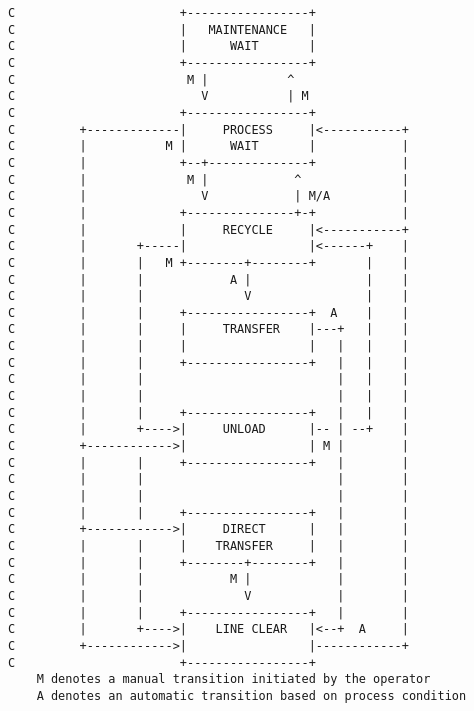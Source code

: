 \documentclass[a4paper,oneside]{article}
\begin{document}
\begin{verbatim}
C                       +-----------------+                  
C                       |   MAINTENANCE   |                  
C                       |      WAIT       |                  
C                       +-----------------+                  
C                        M |           ^                     
C                          V           | M                   
C                       +-----------------+                  
C         +-------------|     PROCESS     |<-----------+    
C         |           M |      WAIT       |            |     
C         |             +--+--------------+            |     
C         |              M |            ^              |     
C         |                V            | M/A          |     
C         |             +---------------+-+            |     
C         |             |     RECYCLE     |<-----------+     
C         |       +-----|                 |<------+    |     
C         |       |   M +--------+--------+       |    |     
C         |       |            A |                |    |     
C         |       |              V                |    |     
C         |       |     +-----------------+  A    |    |     
C         |       |     |     TRANSFER    |---+   |    |     
C         |       |     |                 |   |   |    |     
C         |       |     +-----------------+   |   |    |     
C         |       |                           |   |    |     
C         |       |                           |   |    |     
C         |       |     +-----------------+   |   |    |     
C         |       +---->|     UNLOAD      |-- | --+    |     
C         +------------>|                 | M |        |     
C         |       |     +-----------------+   |        |     
C         |       |                           |        |     
C         |       |                           |        |     
C         |       |     +-----------------+   |        |     
C         +------------>|     DIRECT      |   |        |     
C         |       |     |    TRANSFER     |   |        |     
C         |       |     +--------+--------+   |        |     
C         |       |            M |            |        |     
C         |       |              V            |        |     
C         |       |     +-----------------+   |        |     
C         |       +---->|    LINE CLEAR   |<--+  A     |     
C         +------------>|                 |------------+    
C                       +-----------------+                  
	M denotes a manual transition initiated by the operator
	A denotes an automatic transition based on process condition
\end{verbatim}
\end{document}
